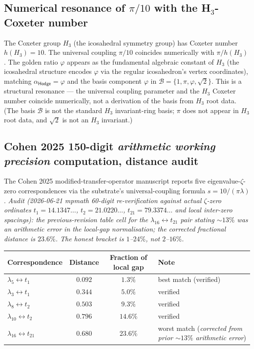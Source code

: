\documentclass[11pt,a4paper]{amsart}
\theoremstyle{plain}
\theoremstyle{definition}
\begin{document}
\subsection{Numerical resonance of \texorpdfstring{$\pi/10$}{pi/10} with the H\texorpdfstring{$_3$}{3}-Coxeter number}\label{subsec:H3-coxeter-numerical}

The Coxeter group $H_3$ (the icosahedral symmetry group) has Coxeter number $h(H_3) = 10$. The universal coupling $\pi/10$ coincides numerically with $\pi/h(H_3)$. The golden ratio $\varphi$ appears as the fundamental algebraic constant of $H_3$ (the icosahedral structure encodes $\varphi$ via the regular icosahedron's vertex coordinates), matching $\alpha_{\textsf{Hodge}} = \varphi$ and the basis component $\varphi$ in $\mathcal{B} = \{1, \pi, \varphi, \sqrt{2}\}$. This is a structural resonance --- the universal coupling parameter and the $H_3$ Coxeter number coincide numerically, not a derivation of the basis from $H_3$ root data. (The basis $\mathcal{B}$ is not the standard $H_3$ invariant-ring basis; $\pi$ does not appear in $H_3$ root data, and $\sqrt{2}$ is not an $H_3$ invariant.)

\subsection{Cohen 2025 150-digit \emph{arithmetic working precision} computation, distance audit}\label{subsec:cohen2025-150digit-audit}

The Cohen 2025 modified-transfer-operator manuscript reports five eigenvalue-$\zeta$-zero correspondences via the substrate's universal-coupling formula $s = 10/(\pi\lambda)$. \emph{Audit (2026-06-21 mpmath 60-digit re-verification against actual $\zeta$-zero ordinates $t_1 = 14.1347\ldots$, $t_2 = 21.0220\ldots$, $t_{21} = 79.3374\ldots$ and local inter-zero spacings): the previous-revision table cell for the $\lambda_{16} \leftrightarrow t_{21}$ pair stating $\sim 13\%$ was an arithmetic error in the local-gap normalisation; the corrected fractional distance is $23.6\%$. The honest bracket is $1$--$24\%$, not $2$--$16\%$.}

\begin{center}
\footnotesize
\begin{tabular}{lccp{4.5cm}}
\toprule
Correspondence & Distance & Fraction of local gap & Note \\
\midrule
$\lambda_5 \leftrightarrow t_1$ & $0.092$ & $1.3\%$ & best match (verified) \\
$\lambda_3 \leftrightarrow t_1$ & $0.344$ & $5.0\%$ & verified \\
$\lambda_8 \leftrightarrow t_2$ & $0.503$ & $9.3\%$ & verified \\
$\lambda_{10} \leftrightarrow t_2$ & $0.796$ & $14.6\%$ & verified \\
$\lambda_{16} \leftrightarrow t_{21}$ & $0.680$ & $\mathbf{23.6\%}$ & worst match (\emph{corrected from prior $\sim 13\%$ arithmetic error}) \\
\bottomrule
\end{tabular}
\end{center}
\end{document}
